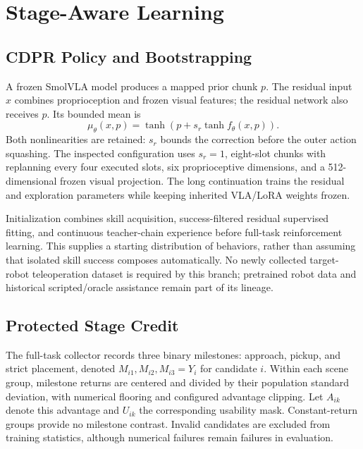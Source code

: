 \section{Stage-Aware Learning}\label{sec:method}
\subsection{CDPR Policy and Bootstrapping}
A frozen SmolVLA model produces a mapped prior chunk $p$. The residual input $x$ combines proprioception and frozen visual features; the residual network also receives $p$. Its bounded mean is
\begin{equation}
\mu_\theta(x,p)=\tanh\!\left(p+s_r\tanh f_\theta(x,p)\right).
\label{eq:actor}
\end{equation}
Both nonlinearities are retained: $s_r$ bounds the correction before the outer action squashing. The inspected configuration uses $s_r=1$, eight-slot chunks with replanning every four executed slots, six proprioceptive dimensions, and a 512-dimensional frozen visual projection. The long continuation trains the residual and exploration parameters while keeping inherited VLA/LoRA weights frozen. 

Initialization combines skill acquisition, success-filtered residual supervised fitting, and continuous teacher-chain experience before full-task reinforcement learning. This supplies a starting distribution of behaviors, rather than assuming that isolated skill success composes automatically. No newly collected target-robot teleoperation dataset is required by this branch; pretrained robot data and historical scripted/oracle assistance remain part of its lineage. 

\subsection{Protected Stage Credit}
The full-task collector records three binary milestones: approach, pickup, and strict placement, denoted $M_{i1},M_{i2},M_{i3}=Y_i$ for candidate $i$. Within each scene group, milestone returns are centered and divided by their population standard deviation, with numerical flooring and configured advantage clipping. Let $A_{ik}$ denote this advantage and $U_{ik}$ the corresponding usability mask. Constant-return groups provide no milestone contrast. Invalid candidates are excluded from training statistics, although numerical failures remain failures in evaluation.

